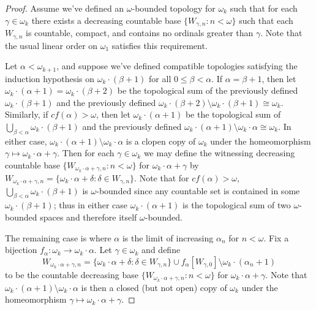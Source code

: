 \documentclass[11pt]{article}
\begin{document}
  \begin{proof}
    Assume we've defined an \(\omega\)-bounded topology for \(\omega_k\) such that
    for each \(\gamma\in\omega_k\) there exists a decreasing countable base
    \(\{W_{\gamma,n}:n<\omega\}\) such that each
    \(W_{\gamma,n}\) is countable, compact,
    and contains no ordinals greater than \(\gamma\).
    Note that the usual linear order on \(\omega_1\) satisfies this requirement.

    Let \(\alpha<\omega_{k+1}\), and suppose we've defined compatible topologies
    satisfying the induction hypothesis on
    \(\omega_k\cdot (\beta+1)\) for all \(0\leq\beta<\alpha\).
    If \(\alpha=\beta+1\), then let
    \(\omega_k\cdot(\alpha+1)=\omega_k\cdot(\beta+2)\) be the topological sum
    of the previously defined \(\omega_k\cdot(\beta+1)\) and the
    previously defined
    \(\omega_k\cdot(\beta+2)\setminus\omega_k\cdot(\beta+1)\cong\omega_k\).
    Similarly, if \(cf(\alpha)>\omega\), then let \(\omega_k\cdot(\alpha+1)\)
    be the topological sum of \(\bigcup_{\beta<\alpha}\omega_k\cdot(\beta+1)\)
    and the previously defined
    \(\omega_k\cdot(\alpha+1)\setminus\omega_k\cdot\alpha\cong\omega_k\).
    In either case, \(\omega_k\cdot(\alpha+1)\setminus\omega_k\cdot\alpha\)
    is a clopen copy of \(\omega_k\) under the homeomorphism
    \(\gamma\mapsto\omega_k\cdot\alpha+\gamma\). Then for each
    \(\gamma\in\omega_k\) we may define the witnessing decreasing countable base
    \(\{W_{\omega_k\cdot\alpha+\gamma,n}:n<\omega\}\) for
    \(\omega_k\cdot\alpha+\gamma\) by
    \(
      W_{\omega_k\cdot\alpha+\gamma,n}
        =
      \{\omega_k\cdot\alpha+\delta:\delta\in W_{\gamma,n}\}
    \). Note that for \(cf(\alpha)>\omega\),
    \(\bigcup_{\beta<\alpha}\omega_k\cdot(\beta+1)\) is \(\omega\)-bounded
    since any countable set is contained in some \(\omega_k\cdot(\beta+1)\);
    thus in either case \(\omega_k\cdot(\alpha+1)\) is the topological
    sum of two \(\omega\)-bounded spaces and therefore itself \(\omega\)-bounded.

    The remaining case is where \(\alpha\) is the limit of increasing
    \(\alpha_n\) for \(n<\omega\). Fix a bijection
    \(
      f_\alpha
        :
      \omega_k
        \to
      \omega_k\cdot\alpha
    \). Let
    \(\gamma\in\omega_k\) and define
    \[
      W_{\omega_k\cdot\alpha+\gamma,n}
        =
      \{\omega_k\cdot\alpha+\delta:\delta\in W_{\gamma,n}\}
        \cup
      f_\alpha[W_{\gamma,0}]
        \setminus
      \omega_k\cdot(\alpha_n+1)
    \]
    to be the countable decreasing
    base \(\{W_{\omega_k\cdot\alpha+\gamma,n}:n<\omega\}\)
    for \(\omega_k\cdot\alpha+\gamma\).
    Note that \(\omega_k\cdot(\alpha+1)\setminus\omega_k\cdot\alpha\) is
    then a closed (but not open) copy of \(\omega_k\) under the homeomorphism
    \(\gamma\mapsto\omega_k\cdot\alpha+\gamma\).


\end{proof}
\end{document}
